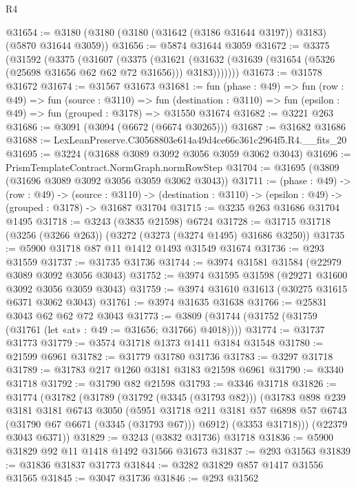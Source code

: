 \begin{lexlean}{R4}
\begin{coremodule}
@31654 := @3180 (@3180 (@3180 (@31642 (@3186 @31644 @3197)) @3183) (@5870 @31644 @3059))
@31656 := @5874 @31644 @3059
@31672 := @3375
    (@31592
      (@3375
        (@31607
          (@3375
            (@31621 (@31632 (@31639 (@31654 (@5326 (@25698 @31656 @62 @62 @72 @31656))) @3183)))))))
@31673 := @31578 @31672
@31674 := @31567 @31673
@31681 := fun (phase : @49) =>
  fun (row : @49) =>
  fun (source : @3110) =>
  fun (destination : @3110) => fun (epsilon : @49) => fun (grouped : @3178) => @31550 @31674
@31682 := @3221 @263
@31686 := @3091 (@3094 (@6672 (@6674 @30265)))
@31687 := @31682 @31686
@31688 := LexLeanPreserve.C30568803e614a49d4ce66c361c2964f5.R4.__fits_20
@31695 := @3224 (@31688 @3089 @3092 @3056 @3059 @3062 @3043)
@31696 := PrismTemplateContract.NormGraph.normRowStep
@31704 := @31695 (@3809 (@31696 @3089 @3092 @3056 @3059 @3062 @3043))
@31711 := (phase : @49) ->
  (row : @49) ->
  (source : @3110) -> (destination : @3110) -> (epsilon : @49) -> (grouped : @3178) -> @31687 @31704
@31715 := @3235 @263 @31686 @31704 @1495
@31718 := @3243 (@3835 @21598) @6724
@31728 := @31715 @31718 (@3256 (@3266 @263)) (@3272 (@3273 (@3274 @1495) @31686 @3250))
@31735 := @5900 @31718 @87 @11 @1412 @1493 @31549 @31674
@31736 := @293 @31559
@31737 := @31735 @31736
@31744 := @3974 @31581 @31584 (@22979 @3089 @3092 @3056 @3043)
@31752 := @3974 @31595 @31598 (@29271 @31600 @3092 @3056 @3059 @3043)
@31759 := @3974 @31610 @31613 (@30275 @31615 @6371 @3062 @3043)
@31761 := @3974 @31635 @31638
@31766 := @25831 @3043 @62 @62 @72 @3043
@31773 := @3809 (@31744 (@31752 (@31759 (@31761 (let «at» : @49 := @31656; @31766) @4018))))
@31774 := @31737 @31773
@31779 := @3574 @31718 @1373 @1411 @3184 @31548
@31780 := @21599 @6961
@31782 := @31779 @31780 @31736
@31783 := @3297 @31718
@31789 := @31783 @217 @1260 @3181 @3183 @21598 @6961
@31790 := @3340 @31718
@31792 := @31790 @82 @21598
@31793 := @3346 @31718
@31826 := @31774
    (@31782
      (@31789
        (@31792 (@3345 (@31793 @82)))
        (@31783
          @898
          @239
          @3181
          @3181
          @6743
          @3050
          (@5951
            @31718
            @211
            @3181
            @57
            @6898
            @57
            @6743
            (@31790 @67 @6671 (@3345 (@31793 @67)))
            @6912)
          (@3353 @31718)))
      (@22379 @3043 @6371))
@31829 := @3243 (@3832 @31736) @31718
@31836 := @5900 @31829 @92 @11 @1418 @1492 @31566 @31673
@31837 := @293 @31563
@31839 := @31836 @31837 @31773
@31844 := @3282 @31829 @857 @1417 @31556 @31565
@31845 := @3047 @31736
@31846 := @293 @31562

\end{coremodule}
\end{lexlean}
